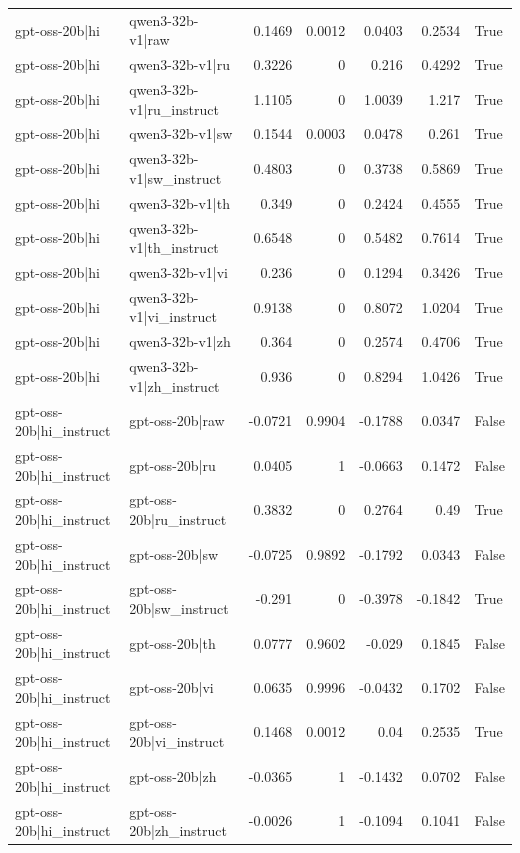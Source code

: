 \begin{table}
\begin{tabular}{l l r r r r l}
gpt-oss-20b|hi & qwen3-32b-v1|raw & 0.1469 & 0.0012 & 0.0403 & 0.2534 & True \\
gpt-oss-20b|hi & qwen3-32b-v1|ru & 0.3226 & 0 & 0.216 & 0.4292 & True \\
gpt-oss-20b|hi & qwen3-32b-v1|ru_instruct & 1.1105 & 0 & 1.0039 & 1.217 & True \\
gpt-oss-20b|hi & qwen3-32b-v1|sw & 0.1544 & 0.0003 & 0.0478 & 0.261 & True \\
gpt-oss-20b|hi & qwen3-32b-v1|sw_instruct & 0.4803 & 0 & 0.3738 & 0.5869 & True \\
gpt-oss-20b|hi & qwen3-32b-v1|th & 0.349 & 0 & 0.2424 & 0.4555 & True \\
gpt-oss-20b|hi & qwen3-32b-v1|th_instruct & 0.6548 & 0 & 0.5482 & 0.7614 & True \\
gpt-oss-20b|hi & qwen3-32b-v1|vi & 0.236 & 0 & 0.1294 & 0.3426 & True \\
gpt-oss-20b|hi & qwen3-32b-v1|vi_instruct & 0.9138 & 0 & 0.8072 & 1.0204 & True \\
gpt-oss-20b|hi & qwen3-32b-v1|zh & 0.364 & 0 & 0.2574 & 0.4706 & True \\
gpt-oss-20b|hi & qwen3-32b-v1|zh_instruct & 0.936 & 0 & 0.8294 & 1.0426 & True \\
gpt-oss-20b|hi_instruct & gpt-oss-20b|raw & -0.0721 & 0.9904 & -0.1788 & 0.0347 & False \\
gpt-oss-20b|hi_instruct & gpt-oss-20b|ru & 0.0405 & 1 & -0.0663 & 0.1472 & False \\
gpt-oss-20b|hi_instruct & gpt-oss-20b|ru_instruct & 0.3832 & 0 & 0.2764 & 0.49 & True \\
gpt-oss-20b|hi_instruct & gpt-oss-20b|sw & -0.0725 & 0.9892 & -0.1792 & 0.0343 & False \\
gpt-oss-20b|hi_instruct & gpt-oss-20b|sw_instruct & -0.291 & 0 & -0.3978 & -0.1842 & True \\
gpt-oss-20b|hi_instruct & gpt-oss-20b|th & 0.0777 & 0.9602 & -0.029 & 0.1845 & False \\
gpt-oss-20b|hi_instruct & gpt-oss-20b|vi & 0.0635 & 0.9996 & -0.0432 & 0.1702 & False \\
gpt-oss-20b|hi_instruct & gpt-oss-20b|vi_instruct & 0.1468 & 0.0012 & 0.04 & 0.2535 & True \\
gpt-oss-20b|hi_instruct & gpt-oss-20b|zh & -0.0365 & 1 & -0.1432 & 0.0702 & False \\
gpt-oss-20b|hi_instruct & gpt-oss-20b|zh_instruct & -0.0026 & 1 & -0.1094 & 0.1041 & False \\

\end{tabular}
\end{table}
